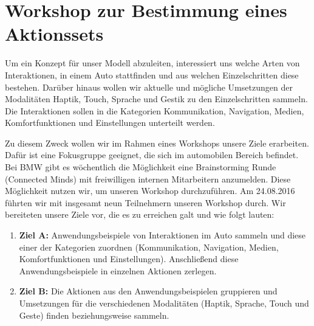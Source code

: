\chapter[Workshop Connected Minds]{Workshop zur Bestimmung eines Aktionssets}\label{cha:Workshop}
Um ein Konzept für unser Modell abzuleiten, interessiert uns welche Arten von Interaktionen, in einem Auto stattfinden und aus welchen Einzelschritten diese bestehen.
Darüber hinaus wollen wir aktuelle und mögliche Umsetzungen der Modalitäten Haptik, Touch, Sprache und Gestik zu den Einzelschritten sammeln.
Die Interaktionen sollen in die Kategorien Kommunikation, Navigation, Medien, Komfortfunktionen und Einstellungen unterteilt werden.

Zu diesem Zweck wollen wir im Rahmen eines Workshops unsere Ziele erarbeiten.
Dafür ist eine Fokusgruppe geeignet, die sich im automobilen Bereich befindet.   
Bei BMW gibt es wöchentlich die Möglichkeit eine Brainstorming Runde (Connected Minds) mit freiwilligen internen Mitarbeitern anzumelden.
Diese Möglichkeit nutzen wir, um unseren Workshop durchzuführen.
Am 24.08.2016 führten wir mit insgesamt neun Teilnehmern unseren Workshop durch. 
Wir bereiteten unsere Ziele vor, die es zu erreichen galt und wie folgt lauten:  
\begin{enumerate}
	\item \textbf{Ziel A:} Anwendungsbeispiele von Interaktionen im Auto sammeln und diese einer der Kategorien zuordnen (Kommunikation, Navigation, Medien, Komfortfunktionen und Einstellungen). Anschließend diese Anwendungsbeispiele in einzelnen Aktionen zerlegen. 
	\item \textbf{Ziel B:} Die Aktionen aus den Anwendungsbeispielen gruppieren und Umsetzungen für die verschiedenen Modalitäten (Haptik, Sprache, Touch und Geste) finden beziehungsweise sammeln.
\end{enumerate}
